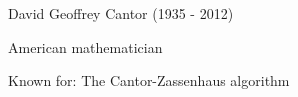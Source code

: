 \begin{frame}

\hfil\hfil David Geoffrey Cantor (1935 - 2012)

\hfil\hfil American mathematician

\hfil\hfil Known for: The Cantor-Zassenhaus algorithm


\end{frame}